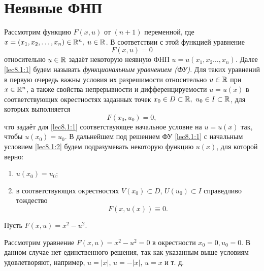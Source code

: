 \documentclass[../../main.tex]{subfiles}
\begin{document}
	\section{Неявные ФНП}

	Рассмотрим функцию $F(x, u)$ от $(n+1)$ переменной, где $x = (x_1, x_2, 
	\ldots,  x_n) \in \mathbb{R}^n, \; u \in \mathbb{R}$. В соответствии с этой функцией уравнение
	 \begin{equation}
		F(x,u) = 0 \label{lec8.1:1}
	 \end{equation}
	 относительно $u \in \mathbb{R}$ задаёт некоторую неявную ФНП $u = u(x_1, x_2 
	 \ldots, x_n)$. Далее \eqref{lec8.1:1} будем называть \emph{функциональным 
	 уравнением (ФУ)}. Для таких уравнений в первую очередь важны условия их 
	 разрешимости относительно $u \in \mathbb{R}$ при $x \in \mathbb{R}^n$, а также свойства 
	 непрерывности и дифференцируемости $u = u(x)$ в соответствующих 
	 окрестностях заданных точек $x_0 \in D \subset \mathbb{R},\ u_0 \in I  \subset \mathbb{R}$, 
	 для которых выполняется
	 \begin{equation}
		F(x_0, u_0) = 0, \label{lec8.1:2}
	 \end{equation}
	 что задаёт для \eqref{lec8.1:1} соответствующее начальное условие на $u = 
	 u(x)$ так, чтобы $u(x_0) = u_0$. В дальнейшем под решением ФУ 
	 \eqref{lec8.1:1} с начальным условием \eqref{lec8.1:2} будем подразумевать 
	 некоторую функцию $u(x)$, для которой верно: 
	 \begin{enumerate}
	 	\item $u(x_0) = u_0$;
	 	\item в соответствующих окрестностях $V(x_0) \subset D$, $U(u_0) 
	 	\subset I$ справедливо тождество
		\begin{equation}
			F(x, u(x)) \equiv 0. \label{lec8.1:3}
		\end{equation}
	 \end{enumerate}
	 \begin{exmp}
		Пусть $F(x, u) = x^2 - u^2$.

		Рассмотрим уравнение $F(x, u) = x^2 - u^2 = 0$ в окрестности $x_0=0, 
		u_0=0$. В данном случае нет единственного решения, так как указанным 
		выше условиям удовлетворяют, например, $u=|x|$, $u=-|x|$, $u = x$  и т. д.
	 \end{exmp}
\end{document}
